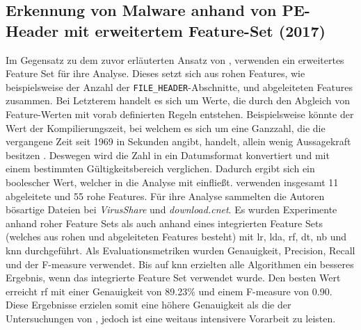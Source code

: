 \documentclass[
    12pt, %
    DIV10,
    ngerman, %
    a4paper, %
    oneside, %
    titlepage, %
    parskip=half, %
    headings=normal, %
    listof=totoc, %
    bibliography=totoc, %
    index=totoc, %
    captions=tableheading, %
    final %
]{scrreprt}
\begin{document}
\subsection{Erkennung von Malware anhand von PE-Header mit erweitertem  Feature-Set (2017)}
Im Gegensatz zu dem zuvor erläuterten Ansatz  von \textcite{Raff2017}, verwenden \textcite{Kumar2017} ein erweitertes Feature Set für ihre Analyse. Dieses setzt sich aus rohen Features, wie beispielsweise der Anzahl der \texttt{FILE\_HEADER}-Abschnitte, und abgeleiteten Features zusammen. Bei Letzterem handelt es sich um Werte, die durch den Abgleich von Feature-Werten mit vorab definierten Regeln entstehen. Beispielsweise könnte der Wert der Kompilierungszeit, bei welchem es sich um eine Ganzzahl, die die vergangene Zeit seit 1969 in Sekunden angibt, handelt, allein wenig Aussagekraft besitzen \parencite{Kumar2017}. Deswegen wird die Zahl in ein Datumsformat konvertiert und mit einem bestimmten Gültigkeitsbereich verglichen. Dadurch ergibt sich ein boolescher Wert, welcher in die Analyse mit einflie{\ss}t. \textcite{Kumar2017} verwenden insgesamt 11 abgeleitete und 55 rohe Features. Für ihre Analyse sammelten die Autoren bösartige Dateien bei \emph{VirusShare} und \emph{download.cnet}. Es wurden Experimente anhand  roher Feature Sets als auch anhand eines integrierten Feature Sets (welches aus rohen und abgeleiteten Features besteht) mit \ac{lr}, \ac{lda}, \ac{rf}, \ac{dt}, \ac{nb} und \ac{knn} durchgeführt. Als Evaluationsmetriken wurden Genauigkeit, Precision, Recall und der F-measure verwendet. Bis auf \ac{knn} erzielten alle Algorithmen ein besseres Ergebnis, wenn das integrierte Feature Set verwendet wurde. Den besten Wert erreicht \ac{rf} mit einer Genauigkeit von 89.23\% und einem F-measure von 0.90. \\
Diese Ergebnisse erzielen somit eine höhere Genauigkeit als die der Untersuchungen von \textcite{Raff2017}, jedoch ist eine weitaus intensivere Vorarbeit zu leisten.
%
\end{document}
